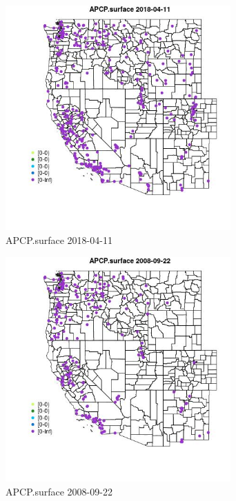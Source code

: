 \begin{figure} 
\centering  
\includegraphics[width=0.77\textwidth]{Code_Outputs/Report_ML_input_PM25_Step4_part_e_de_duplicated_aves_compiled_2019-05-18wNAs_MapObsAPCPsurface2018-04-11.jpg} 
\caption{\label{fig:Report_ML_input_PM25_Step4_part_e_de_duplicated_aves_compiled_2019-05-18wNAsMapObsAPCPsurface2018-04-11}APCP.surface 2018-04-11} 
\end{figure} 
 

\begin{figure} 
\centering  
\includegraphics[width=0.77\textwidth]{Code_Outputs/Report_ML_input_PM25_Step4_part_e_de_duplicated_aves_compiled_2019-05-18wNAs_MapObsAPCPsurface2008-09-22.jpg} 
\caption{\label{fig:Report_ML_input_PM25_Step4_part_e_de_duplicated_aves_compiled_2019-05-18wNAsMapObsAPCPsurface2008-09-22}APCP.surface 2008-09-22} 
\end{figure} 
 

